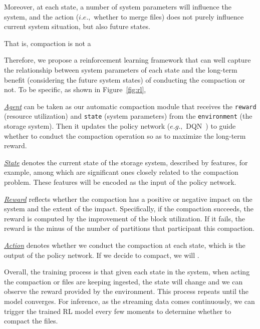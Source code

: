    Moreover,  at each state, a number of system parameters  will influence the system, and the action ($i.e.,$ whether to merge files) does not purely influence current system situation, but also future states.
   
    That is, compaction is not a 

Therefore, we propose a reinforcement learning framework that can well capture the relationship between system parameters of each state and the long-term benefit (considering the future system states) of conducting the compaction or not. 
To be specific, as shown in  Figure~\ref{fig:rl}, 

\noindent \underline{\textit{Agent}} can be taken as our automatic compaction module that receives the \texttt{reward} (resource utilization) and \texttt{state} (system parameters) from the \texttt{environment} (the storage system). Then it updates the policy network ($e.g.,$ DQN~\cite{}) to guide whether to conduct the compaction operation so as to maximize the long-term reward.

\noindent \underline{\textit{State}} denotes the current state of the storage system, described by  features, for example, among which  are significant ones closely  related to the compaction problem. These features will be encoded as the input of the policy network.

\noindent \underline{\textit{Reward}}  reflects whether the compaction  has a positive or negative impact on the system and the extent of the impact. Specifically, if the compaction succeeds, the reward is  computed by the improvement of the block utilization. If it fails, the reward is the minus of the number of partitions that participant this compaction.

\noindent \underline{\textit{Action}} denotes whether we conduct the compaction at each state, which is the output of the policy network. If we decide to compact, we will .

Overall, the training process is that given each state in the system, when acting the compaction or files are keeping ingested, the state will change and we can observe the reward provided by the environment.  This process repeats until the model converges. For inference, as the streaming data comes continuously, we can trigger the trained RL model every few moments to determine whether to  compact the files.

